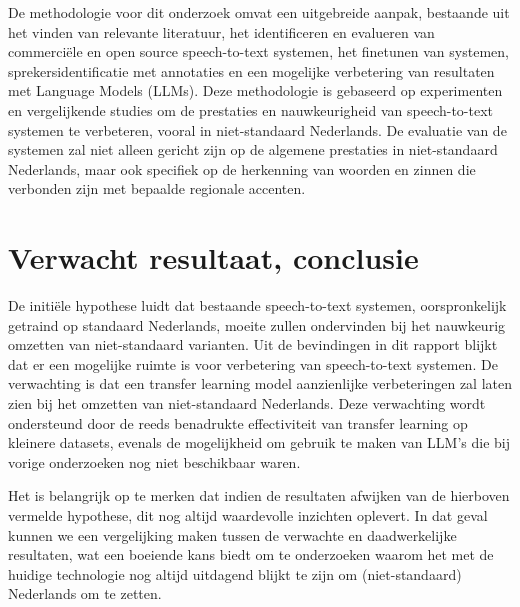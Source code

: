\par De methodologie voor dit onderzoek omvat een uitgebreide aanpak, bestaande uit het vinden van relevante literatuur, het identificeren en evalueren van commerciële en open source speech-to-text systemen, het finetunen van systemen, sprekersidentificatie met annotaties en een mogelijke verbetering van resultaten met Language Models (LLMs). Deze methodologie is gebaseerd op experimenten en vergelijkende studies om de prestaties en nauwkeurigheid van speech-to-text systemen te verbeteren, vooral in niet-standaard Nederlands. De evaluatie van de systemen zal niet alleen gericht zijn op de algemene prestaties in niet-standaard Nederlands, maar ook specifiek op de herkenning van woorden en zinnen die verbonden zijn met bepaalde regionale accenten.

\section{Verwacht resultaat, conclusie}%
\label{sec:verwachte_resultaten}

De initiële hypothese luidt dat bestaande speech-to-text systemen, oorspronkelijk getraind op standaard Nederlands, moeite zullen ondervinden bij het nauwkeurig omzetten van niet-standaard varianten.
Uit de bevindingen in dit rapport blijkt dat er een mogelijke ruimte is voor verbetering van speech-to-text systemen. De verwachting is dat een transfer learning model aanzienlijke verbeteringen zal laten zien bij het omzetten van niet-standaard Nederlands. Deze verwachting wordt ondersteund door de reeds benadrukte effectiviteit van transfer learning op kleinere datasets, evenals de mogelijkheid om gebruik te maken van LLM's die bij vorige onderzoeken nog niet beschikbaar waren.

Het is belangrijk op te merken dat indien de resultaten afwijken van de hierboven vermelde hypothese, dit nog altijd waardevolle inzichten oplevert. In dat geval kunnen we een vergelijking maken tussen de verwachte en daadwerkelijke resultaten, wat een boeiende kans biedt om te onderzoeken waarom het met de huidige technologie nog altijd uitdagend blijkt te zijn om (niet-standaard) Nederlands om te zetten.
